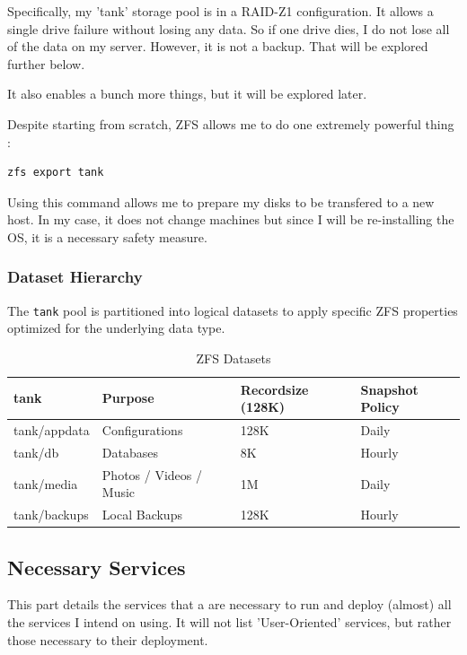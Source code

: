Specifically, my 'tank' storage pool is in a RAID-Z1 configuration.
It allows a single drive failure without losing any data. So if one drive dies, I do not lose all of the data on my server.
However, it is not a backup. That will be explored further below.

It also enables a bunch more things, but it will be explored later.

Despite starting from scratch, ZFS allows me to do one extremely powerful thing :
\begin{lstlisting}[language=python]
    zfs export tank
\end{lstlisting}

Using this command allows me to prepare my disks to be transfered to a new host. 
In my case, it does not change machines but since I will be re-installing the OS, it is a necessary safety measure.

\subsubsection{Dataset Hierarchy}
The \texttt{tank} pool is partitioned into logical datasets to apply specific ZFS properties optimized for the underlying data type.

\begin{table}[h]
    \centering
    \begin{tabular}{|l|l|l|l|}
        \hline
         \textbf{tank} & \textbf{Purpose} & \textbf{Recordsize} (128K) & \textbf{Snapshot Policy} \\ \hline
         tank/appdata & Configurations & 128K & Daily \\
         tank/db & Databases & 8K & Hourly \\
         tank/media & Photos / Videos / Music & 1M & Daily \\
         tank/backups & Local Backups & 128K & Hourly \\ \hline
    \end{tabular}
    \caption{ZFS Datasets}
    \label{tab:placeholder}
\end{table}

\subsection{Necessary Services}
This part details the services that a are necessary to run and deploy (almost) all the services I intend on using.
It will not list 'User-Oriented' services, but rather those necessary to their deployment. 
